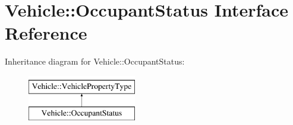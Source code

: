 \hypertarget{interfaceVehicle_1_1OccupantStatus}{\section{Vehicle\-:\-:Occupant\-Status Interface Reference}
\label{interfaceVehicle_1_1OccupantStatus}
}
Inheritance diagram for Vehicle\-:\-:Occupant\-Status\-:\begin{figure}[H]
\begin{center}
\leavevmode
\includegraphics[height=2.000000cm]{interfaceVehicle_1_1OccupantStatus}
\end{center}
\end{figure}
